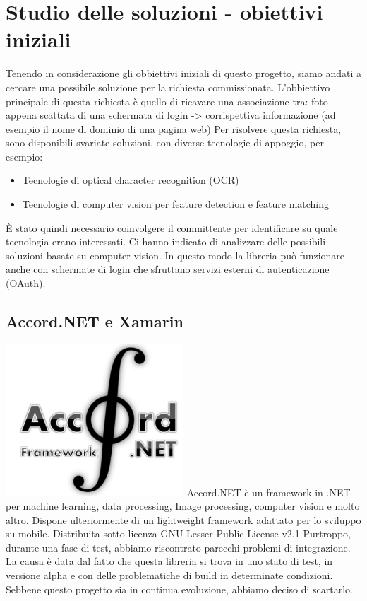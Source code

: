 \documentclass[twoside]{supsistudent}
\newcommand{\Decaa}{\newline\vspace{0.5mm}\newline\noindent}
\begin{document}
\section{Studio delle soluzioni - obiettivi iniziali}
Tenendo in considerazione gli obbiettivi iniziali di questo progetto, siamo andati a cercare una possibile soluzione per la richiesta commissionata.
\Decaa
L'obbiettivo principale di questa richiesta è quello di ricavare una associazione tra: foto appena scattata di una schermata di login -> corrispettiva informazione (ad esempio il nome di dominio di una pagina web)
Per risolvere questa richiesta, sono disponibili svariate soluzioni, con diverse tecnologie di appoggio, per esempio:
\begin{itemize}
\item Tecnologie di optical character recognition (OCR)
\item Tecnologie di computer vision per feature detection e feature matching
\end{itemize}
È stato quindi necessario coinvolgere il committente per identificare su quale tecnologia erano interessati. Ci hanno indicato di analizzare delle possibili soluzioni basate su computer vision. In questo modo la libreria può funzionare anche con schermate di login che sfruttano servizi esterni di autenticazione (OAuth).

\subsection{Accord.NET e Xamarin}
\includegraphics[width=0.5\textwidth]{Pictures/accord_net.png}
\newline
Accord.NET è un framework in .NET per machine learning, data processing, Image processing, computer vision e molto altro. Dispone ulteriormente di un lightweight framework adattato per lo sviluppo su mobile.
\Decaa
Distribuita sotto licenza GNU Lesser Public License v2.1
\Decaa
Purtroppo, durante una fase di test, abbiamo riscontrato parecchi problemi di integrazione. La causa è data dal fatto che questa libreria si trova in uno stato di test, in versione alpha e con delle problematiche di build in determinate condizioni.
\Decaa
Sebbene questo progetto sia in continua evoluzione, abbiamo deciso di scartarlo.
\end{document}
